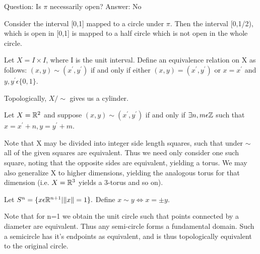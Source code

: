 Question: Is $\pi$ necessarily open? Answer: No

Consider the interval [0,1] mapped to a circle under $\pi$. Then the interval [0,1/2), which is open in [0,1] is mapped to a half circle which is not open in the whole circle. \placeholder
\begin{example}
	Let $X=I \times I$, where I is the unit interval. Define an equivalence relation on X as follows: $(x,y)\sim(x^{'},y^{'})$ if and only if either $(x,y)=(x^{'},y^{'})$ or $x=x^{'}$ and $y,y^{'} \epsilon \{0,1\}$.
	
	Topologically, $X/\sim$ gives us a cylinder. \placeholder 
\end{example}
\begin{example}
	Let $X = \mathbb R^{2}$ and suppose $(x,y)\sim(x^{'},y^{'})$ if and only if $\exists n,m \epsilon \mathbb Z$ such that $x = x^{'} + n, y = y^{'} + m$. 
\end{example}

Note that X may be divided into integer side length squares, such that under $\sim$ all of the given squares are equivalent. Thus we need only consider one such square, noting that the opposite sides are equivalent, yielding a torus. We may also generalize X to higher dimensions, yielding the analogous torus for that dimension (i.e. $X = \mathbb R^{3}$ yields a 3-torus and so on). \placeholder
\begin{example}
	Let $S^{n} = \{x \epsilon \mathbb R^{n+1}| \|x\| = 1\}.$ Define $x \sim y \Leftrightarrow x = \pm y$. 
\end{example}

Note that for n=1 we obtain the unit circle such that points connected by a diameter are equivalent. Thus any semi-circle forms a fundamental domain. Such a semicircle has it's endpoints as equivalent, and is thus topologically equivalent to the original circle.

